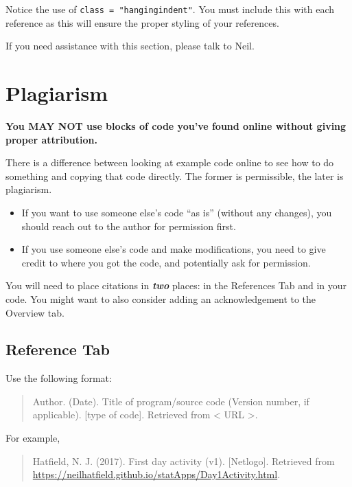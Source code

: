 \documentclass[
]{book}
\providecommand{\tightlist}{%
  \setlength{\itemsep}{0pt}\setlength{\parskip}{0pt}}
\begin{document}
Notice the use of \texttt{class\ =\ "hangingindent"}. You must include this with each reference as this will ensure the proper styling of your references.

If you need assistance with this section, please talk to Neil.

\hypertarget{plagiarism}{%
\section{Plagiarism}\label{plagiarism}}

\textbf{You MAY NOT use blocks of code you've found online without giving proper attribution.}

There is a difference between looking at example code online to see how to do something and copying that code directly. The former is permissible, the later is plagiarism.

\begin{itemize}
\tightlist
\item
  If you want to use someone else's code ``as is'' (without any changes), you should reach out to the author for permission first.
\item
  If you use someone else's code and make modifications, you need to give credit to where you got the code, and potentially ask for permission.
\end{itemize}

You will need to place citations in \emph{\textbf{two}} places: in the References Tab and in your code. You might want to also consider adding an acknowledgement to the Overview tab.

\hypertarget{reference-tab}{%
\subsection{Reference Tab}\label{reference-tab}}

Use the following format:

\begin{quote}
Author. (Date). Title of program/source code (Version number, if applicable). {[}type of code{]}. Retrieved from \textless{} URL \textgreater.
\end{quote}

For example,

\begin{quote}
Hatfield, N. J. (2017). First day activity (v1). {[}Netlogo{]}. Retrieved from \url{https://neilhatfield.github.io/statApps/Day1Activity.html}.
\end{quote}
\end{document}
